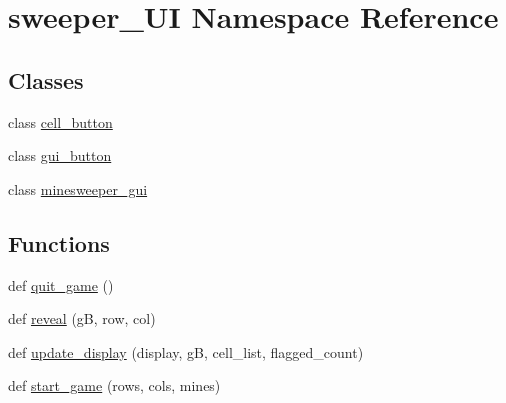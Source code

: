 \hypertarget{namespacesweeper___u_i}{}\section{sweeper\+\_\+\+UI Namespace Reference}
\label{namespacesweeper___u_i}
\subsection*{Classes}
\begin{DoxyCompactItemize}
\item 
class \hyperlink{classsweeper___u_i_1_1cell__button}{cell\+\_\+button}
\item 
class \hyperlink{classsweeper___u_i_1_1gui__button}{gui\+\_\+button}
\item 
class \hyperlink{classsweeper___u_i_1_1minesweeper__gui}{minesweeper\+\_\+gui}
\end{DoxyCompactItemize}
\subsection*{Functions}
\begin{DoxyCompactItemize}
\item 
def \hyperlink{namespacesweeper___u_i_a60d3b69c6e596a8cc72c88a3fd159926}{quit\+\_\+game} ()
\item 
def \hyperlink{namespacesweeper___u_i_a1d2372a72b38f4c14cfd981325b3ee83}{reveal} (gB, row, col)
\item 
def \hyperlink{namespacesweeper___u_i_a0b6997d23bebdf719e9ba3f83bb89b1a}{update\+\_\+display} (display, gB, cell\+\_\+list, flagged\+\_\+count)
\item 
def \hyperlink{namespacesweeper___u_i_a6d328451ee39123c0cb2af67b6a79379}{start\+\_\+game} (rows, cols, mines)
\end{DoxyCompactItemize}
